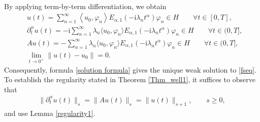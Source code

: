 \documentclass[reqno]{amsart}
\makeatletter
\renewenvironment{proof}[1][\proofname]{\par
  \pushQED{\qed}%
  \normalfont \topsep6\p@\@plus6\p@\relax
  \trivlist
  \item[\hskip\labelsep\bfseries #1\@addpunct{.}]%
}{%
  \popQED\endtrivlist\@endpefalse
}
\numberwithin{equation}{section}
\makeatother
\begin{document}
\begin{proof}
\begin{align}
	\end{align}
	By applying term-by-term differentiation, we obtain
	\begin{align*}
            & u(t)=\sum_{n=1}^{\infty}\left\langle u_0, \varphi_n\right\rangle E_{\alpha, 1}\left(-\mathrm{i}\lambda_n t^\alpha\right) \varphi_n\in H \qquad \forall t\in [0,T],\\
		&\partial_t^\alpha u(t)=-\mathrm{i}\sum_{n=1}^{\infty}\lambda_{n}\langle u_0,\varphi_{n}\rangle E_{\alpha,1}(-\mathrm{i}\lambda_{n}t^{\alpha})\varphi_n\in H\qquad \forall t\in (0,T], \\
		&Au(t)=-\sum_{n=1}^{\infty}\lambda_{n}\langle u_0,\varphi_{n}\rangle E_{\alpha,1}(-\mathrm{i}\lambda_{n}t^{\alpha})\varphi_n\in H\qquad \forall t\in (0,T],\\
		&\lim_{t\to 0^{+}}\|u(t)-u_0\|=0.
	\end{align*}
Consequently, formula \eqref{solution formula} gives the unique weak solution to \eqref{fseq}. To establish the regularity stated in Theorem \ref{Thm_well1}, it suffices to observe that
\begin{align*}
	\|\partial_t^{\alpha}u(t)\|_s=\|Au(t)\|_s=\|u(t)\|_{s+1},\qquad s\ge 0,
\end{align*}
and use Lemma \ref{regularity1}.
\end{proof}
\end{document}
